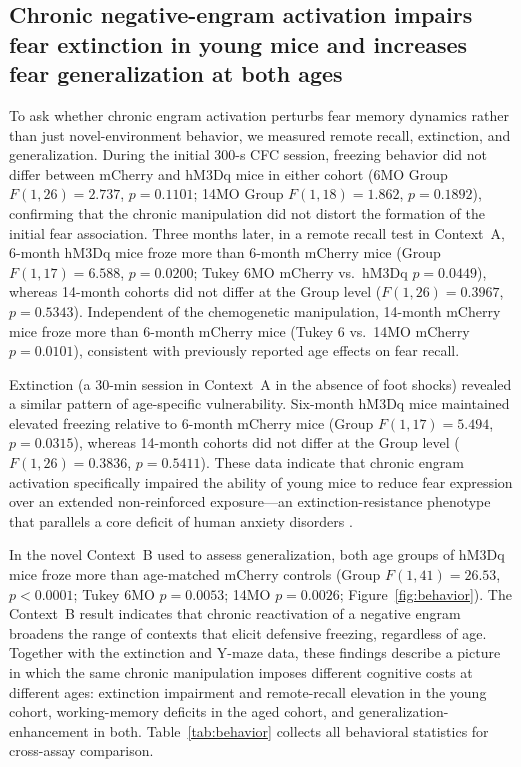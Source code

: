 \documentclass[11pt]{article}
\begin{document}
\subsection{Chronic negative-engram activation impairs fear extinction in young mice and increases fear generalization at both ages}

To ask whether chronic engram activation perturbs fear memory dynamics rather than just novel-environment behavior, we measured remote recall, extinction, and generalization. During the initial 300-s CFC session, freezing behavior did not differ between mCherry and hM3Dq mice in either cohort (6MO Group $F(1,26)=2.737$, $p=0.1101$; 14MO Group $F(1,18)=1.862$, $p=0.1892$), confirming that the chronic manipulation did not distort the formation of the initial fear association. Three months later, in a remote recall test in Context~A, 6-month hM3Dq mice froze more than 6-month mCherry mice (Group $F(1,17)=6.588$, $p=0.0200$; Tukey 6MO mCherry vs.~hM3Dq $p=0.0449$), whereas 14-month cohorts did not differ at the Group level ($F(1,26)=0.3967$, $p=0.5343$). Independent of the chemogenetic manipulation, 14-month mCherry mice froze more than 6-month mCherry mice (Tukey 6 vs.~14MO mCherry $p=0.0101$), consistent with previously reported age effects on fear recall.

Extinction (a 30-min session in Context~A in the absence of foot shocks) revealed a similar pattern of age-specific vulnerability. Six-month hM3Dq mice maintained elevated freezing relative to 6-month mCherry mice (Group $F(1,17)=5.494$, $p=0.0315$), whereas 14-month cohorts did not differ at the Group level ($F(1,26)=0.3836$, $p=0.5411$). These data indicate that chronic engram activation specifically impaired the ability of young mice to reduce fear expression over an extended non-reinforced exposure---an extinction-resistance phenotype that parallels a core deficit of human anxiety disorders \citep{maren2013contextual,tovote2015circuits}.

In the novel Context~B used to assess generalization, both age groups of hM3Dq mice froze more than age-matched mCherry controls (Group $F(1,41)=26.53$, $p<0.0001$; Tukey 6MO $p=0.0053$; 14MO $p=0.0026$; Figure~\ref{fig:behavior}). The Context~B result indicates that chronic reactivation of a negative engram broadens the range of contexts that elicit defensive freezing, regardless of age. Together with the extinction and Y-maze data, these findings describe a picture in which the same chronic manipulation imposes different cognitive costs at different ages: extinction impairment and remote-recall elevation in the young cohort, working-memory deficits in the aged cohort, and generalization-enhancement in both. Table~\ref{tab:behavior} collects all behavioral statistics for cross-assay comparison.
\end{document}
